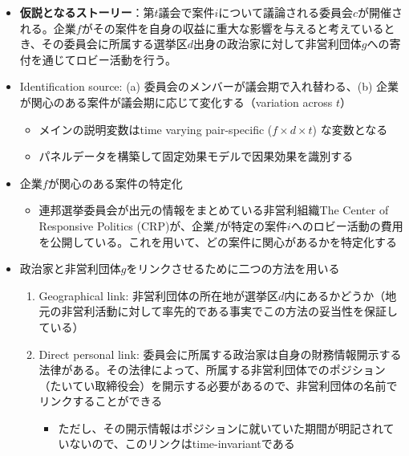 \documentclass[../root]{subfiles}
\begin{document}
    \begin{itemize}
    
    \item
      \textbf{仮説となるストーリー}：第\(t\)議会で案件\(i\)について議論される委員会\(c\)が開催される。企業\(f\)がその案件を自身の収益に重大な影響を与えると考えているとき、その委員会に所属する選挙区\(d\)出身の政治家に対して非営利団体\(g\)への寄付を通じてロビー活動を行う。
    \item
      Identification source: (a) 委員会のメンバーが議会期で入れ替わる、(b) 企業が関心のある案件が議会期に応じて変化する（variation across \(t\)）

      \begin{itemize}
      
      \item
        メインの説明変数はtime varying pair-specific (\(f \times d \times t\)) な変数となる
      \item
        パネルデータを構築して固定効果モデルで因果効果を識別する
      \end{itemize}
    \item
      企業\(f\)が関心のある案件の特定化

      \begin{itemize}
      
      \item
        連邦選挙委員会が出元の情報をまとめている非営利組織The Center of Responsive Politics (CRP)が、企業\(f\)が特定の案件\(i\)へのロビー活動の費用を公開している。これを用いて、どの案件に関心があるかを特定化する
      \end{itemize}
    \item
      政治家と非営利団体\(g\)をリンクさせるために二つの方法を用いる

      \begin{enumerate}
      \def\labelenumi{\arabic{enumi}.}
      
      \item
        Geographical link: 非営利団体の所在地が選挙区\(d\)内にあるかどうか（地元の非営利活動に対して率先的である事実でこの方法の妥当性を保証している）
      \item
        Direct personal link: 委員会に所属する政治家は自身の財務情報開示する法律がある。その法律によって、所属する非営利団体でのポジション（たいてい取締役会）を開示する必要があるので、非営利団体の名前でリンクすることができる

        \begin{itemize}
        
        \item
          ただし、その開示情報はポジションに就いていた期間が明記されていないので、このリンクはtime-invariantである
        \end{itemize}
      \end{enumerate}
    \end{itemize}
\end{document}
